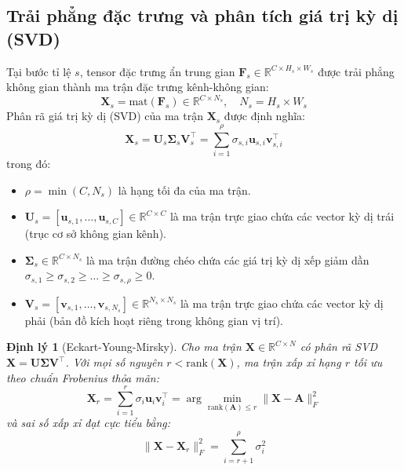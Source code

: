 \documentclass[10pt,twocolumn,letterpaper]{article}
\newtheorem{theorem}{Định lý}
\begin{document}
\subsection{Trải phẳng đặc trưng và phân tích giá trị kỳ dị (SVD)}
Tại bước tỉ lệ $s$, tensor đặc trưng ẩn trung gian $\mathbf{F}_s \in \mathbb{R}^{C \times H_s \times W_s}$ được trải phẳng không gian thành ma trận đặc trưng kênh-không gian:
\begin{equation}
\mathbf{X}_s = \text{mat}(\mathbf{F}_s) \in \mathbb{R}^{C \times N_s}, \quad N_s = H_s \times W_s
\end{equation}
Phân rã giá trị kỳ dị (SVD) của ma trận $\mathbf{X}_s$ được định nghĩa:
\begin{equation}
\mathbf{X}_s = \mathbf{U}_s \boldsymbol{\Sigma}_s \mathbf{V}_s^\top = \sum_{i=1}^{\rho} \sigma_{s, i} \mathbf{u}_{s, i} \mathbf{v}_{s, i}^\top
\end{equation}
trong đó:
\begin{itemize}
    \item $\rho = \min(C, N_s)$ là hạng tối đa của ma trận.
    \item $\mathbf{U}_s = [\mathbf{u}_{s,1}, \dots, \mathbf{u}_{s,C}] \in \mathbb{R}^{C \times C}$ là ma trận trực giao chứa các vector kỳ dị trái (trục cơ sở không gian kênh).
    \item $\boldsymbol{\Sigma}_s \in \mathbb{R}^{C \times N_s}$ là ma trận đường chéo chứa các giá trị kỳ dị xếp giảm dần $\sigma_{s, 1} \ge \sigma_{s, 2} \ge \dots \ge \sigma_{s, \rho} \ge 0$.
    \item $\mathbf{V}_s = [\mathbf{v}_{s,1}, \dots, \mathbf{v}_{s,N_s}] \in \mathbb{R}^{N_s \times N_s}$ là ma trận trực giao chứa các vector kỳ dị phải (bản đồ kích hoạt riêng trong không gian vị trí).
\end{itemize}

\begin{theorem}[Eckart-Young-Mirsky]
Cho ma trận $\mathbf{X} \in \mathbb{R}^{C \times N}$ có phân rã SVD $\mathbf{X} = \mathbf{U}\boldsymbol{\Sigma}\mathbf{V}^\top$. Với mọi số nguyên $r < \text{rank}(\mathbf{X})$, ma trận xấp xỉ hạng $r$ tối ưu theo chuẩn Frobenius thỏa mãn:
\begin{equation}
\mathbf{X}_r = \sum_{i=1}^{r} \sigma_i \mathbf{u}_i \mathbf{v}_i^\top = \arg\min_{\text{rank}(\mathbf{A}) \le r} \|\mathbf{X} - \mathbf{A}\|_F^2
\end{equation}
và sai số xấp xỉ đạt cực tiểu bằng:
\begin{equation}
\|\mathbf{X} - \mathbf{X}_r\|_F^2 = \sum_{i=r+1}^{\rho} \sigma_i^2
\end{equation}
\end{theorem}
\end{document}
